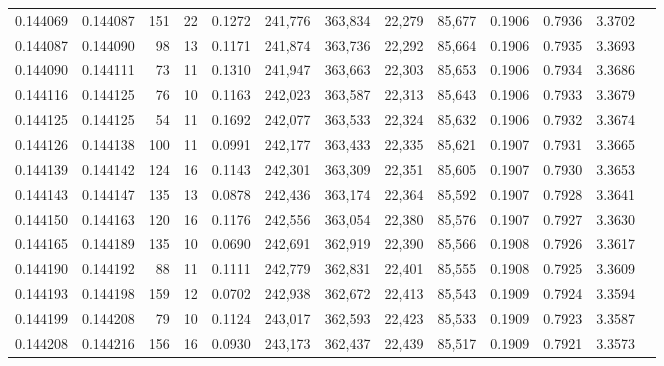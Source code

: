 \begin{tabular}{rrrrrrrrrrrrr}
0.144069 & 0.144087 &   151 &  22 &                                     0.1272 & 241,776 & 363,834 &  22,279 &  85,677 & 0.1906 & 0.7936 & 3.3702 \\
0.144087 & 0.144090 &    98 &  13 &                                     0.1171 & 241,874 & 363,736 &  22,292 &  85,664 & 0.1906 & 0.7935 & 3.3693 \\
0.144090 & 0.144111 &    73 &  11 &                                     0.1310 & 241,947 & 363,663 &  22,303 &  85,653 & 0.1906 & 0.7934 & 3.3686 \\
0.144116 & 0.144125 &    76 &  10 &                                     0.1163 & 242,023 & 363,587 &  22,313 &  85,643 & 0.1906 & 0.7933 & 3.3679 \\
0.144125 & 0.144125 &    54 &  11 &                                     0.1692 & 242,077 & 363,533 &  22,324 &  85,632 & 0.1906 & 0.7932 & 3.3674 \\
0.144126 & 0.144138 &   100 &  11 &                                     0.0991 & 242,177 & 363,433 &  22,335 &  85,621 & 0.1907 & 0.7931 & 3.3665 \\
0.144139 & 0.144142 &   124 &  16 &                                     0.1143 & 242,301 & 363,309 &  22,351 &  85,605 & 0.1907 & 0.7930 & 3.3653 \\
0.144143 & 0.144147 &   135 &  13 &                                     0.0878 & 242,436 & 363,174 &  22,364 &  85,592 & 0.1907 & 0.7928 & 3.3641 \\
0.144150 & 0.144163 &   120 &  16 &                                     0.1176 & 242,556 & 363,054 &  22,380 &  85,576 & 0.1907 & 0.7927 & 3.3630 \\
0.144165 & 0.144189 &   135 &  10 &                                     0.0690 & 242,691 & 362,919 &  22,390 &  85,566 & 0.1908 & 0.7926 & 3.3617 \\
0.144190 & 0.144192 &    88 &  11 &                                     0.1111 & 242,779 & 362,831 &  22,401 &  85,555 & 0.1908 & 0.7925 & 3.3609 \\
0.144193 & 0.144198 &   159 &  12 &                                     0.0702 & 242,938 & 362,672 &  22,413 &  85,543 & 0.1909 & 0.7924 & 3.3594 \\
0.144199 & 0.144208 &    79 &  10 &                                     0.1124 & 243,017 & 362,593 &  22,423 &  85,533 & 0.1909 & 0.7923 & 3.3587 \\
0.144208 & 0.144216 &   156 &  16 &                                     0.0930 & 243,173 & 362,437 &  22,439 &  85,517 & 0.1909 & 0.7921 & 3.3573 \\

\end{tabular}
